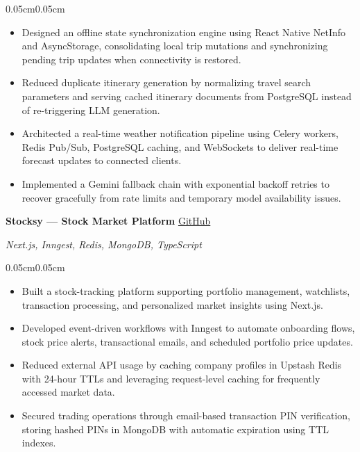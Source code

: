 \documentclass[10pt, letterpaper]{article}
\newenvironment{highlights}{
\begin{itemize}[
    topsep=0.03cm,
    itemsep=0.8pt,
    parsep=0pt,
    partopsep=0pt,
    leftmargin=0.38cm
]
}{
\end{itemize}
}
\newenvironment{onecolentry}{
\begin{adjustwidth}{0.05cm}{0.05cm}
}{
\end{adjustwidth}
}
\let\hrefWithoutArrow\href
\renewcommand{\href}[2]{\hrefWithoutArrow{#1}{#2}}
\begin{document}
\begin{onecolentry}
\begin{highlights}

\item Designed an offline state synchronization engine using React Native NetInfo and AsyncStorage, consolidating local trip mutations and synchronizing pending trip updates when connectivity is restored.

\item Reduced duplicate itinerary generation by normalizing travel search parameters and serving cached itinerary documents from PostgreSQL instead of re-triggering LLM generation.

\item Architected a real-time weather notification pipeline using Celery workers, Redis Pub/Sub, PostgreSQL caching, and WebSockets to deliver real-time forecast updates to connected clients.

\item Implemented a Gemini fallback chain with exponential backoff retries to recover gracefully from rate limits and temporary model availability issues.

\end{highlights}
\end{onecolentry}

\vspace{0.15cm}



\textbf{Stocksy --- Stock Market Platform}
\hfill
\href{https://github.com/shekar2280/stocksy}{GitHub}

\textit{Next.js, Inngest, Redis, MongoDB, TypeScript}

\begin{onecolentry}
\begin{highlights}

\item Built a stock-tracking platform supporting portfolio management, watchlists, transaction processing, and personalized market insights using Next.js.

\item Developed event-driven workflows with Inngest to automate onboarding flows, stock price alerts, transactional emails, and scheduled portfolio price updates.

\item Reduced external API usage by caching company profiles in Upstash Redis with 24-hour TTLs and leveraging request-level caching for frequently accessed market data.

\item Secured trading operations through email-based transaction PIN verification, storing hashed PINs in MongoDB with automatic expiration using TTL indexes.

\end{highlights}
\end{onecolentry}
\end{document}
